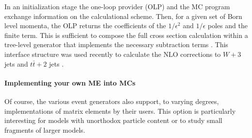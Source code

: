 In an initialization stage the one-loop provider (OLP) and the MC 
program exchange information on the calculational scheme. Then, for a given 
set of Born level momenta, the OLP returns the coefficients of the 
$1/\epsilon^2$ and $1/\epsilon$ poles and the finite term. This is sufficient 
to compose the full cross section calculation within a tree-level generator 
that implements the necessary subtraction terms \cite{Gleisberg:2007md,Frederix:2008hu,Frederix:2009yq,Czakon:2009ss}. This interface 
structure was used recently to calculate the NLO corrections to $W+3$ jets 
\cite{Berger:2009ep} and $t\bar{t}+2$ jets \cite{Bevilacqua:2010ve}.


\paragraph{Implementing your own ME into MCs}

Of course, the various event generators also support, to varying degrees,
implementations of matrix elements by their users.  This option is particularly
interesting for models with unorthodox particle content or to study small
fragments of larger models.  
